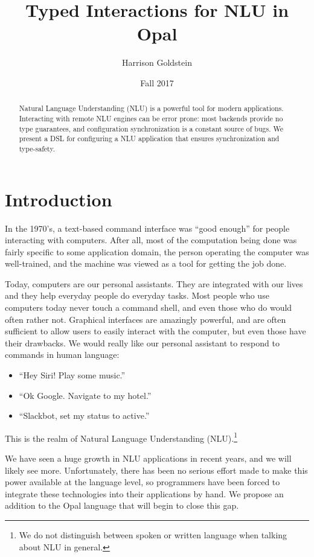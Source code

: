 \documentclass[twocolumn]{article}
\title{Typed Interactions for NLU in Opal}
\author{Harrison Goldstein}
\date{Fall 2017}
\begin{document}
\maketitle

\begin{abstract}
  Natural Language Understanding (NLU) is a powerful tool for modern
  applications. Interacting with remote NLU engines can be error prone: most
  backends provide no type guarantees, and configuration synchronization is a
  constant source of bugs. We present a DSL for configuring a NLU application
  that ensures synchronization and type-safety.
\end{abstract}

\section{Introduction} \label{introduction}
In the 1970's, a text-based command interface was ``good enough'' for people
interacting with computers. After all, most of the computation being done was
fairly specific to some application domain, the person operating the computer
was well-trained, and the machine was viewed as a tool for getting the job done.

Today, computers are our personal assistants. They are integrated with our lives
and they help everyday people do everyday tasks. Most people who use computers
today never touch a command shell, and even those who do would often rather not.
Graphical interfaces are amazingly powerful, and are often sufficient to allow
users to easily interact with the computer, but even those have their drawbacks.
We would really like our personal assistant to respond to commands in human
language:
\begin{itemize}
\item ``Hey Siri! Play some music.''
\item ``Ok Google. Navigate to my hotel.''
\item ``Slackbot, set my status to active.''
\end{itemize}
This is the realm of Natural Language Understanding (NLU).\footnote{We do not
  distinguish between spoken or written language when talking about NLU in
  general.}

We have seen a huge growth in NLU applications in recent years, and we will
likely see more. Unfortunately, there has been no serious effort made to make
this power available at the language level, so programmers have been forced to
integrate these technologies into their applications by hand. We propose an
addition to the Opal language that will begin to close this gap.
\end{document}
